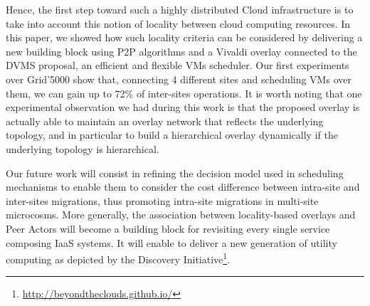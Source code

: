 Hence, the first step toward such a highly distributed Cloud infrastructure is to take
into account this notion of locality between cloud computing resources. In this paper, we
showed how such locality criteria can be considered by delivering a new building block using
P2P algorithms and a Vivaldi overlay connected to the DVMS proposal, an efficient and
flexible VMs scheduler. Our first experiments over Grid'5000 show that, connecting 4
different sites and scheduling VMs over them, we can gain up to 72\% of inter-sites
operations. It is worth noting that one experimental observation we had during this work
is that the proposed overlay is actually able to maintain an overlay network that
reflects the underlying topology, and in particular to build a hierarchical overlay
dynamically if the underlying topology is hierarchical.

Our future work will consist in refining the decision model used in scheduling mechanisms
to enable them to consider the cost difference between intra-site and inter-sites
migrations, thus promoting intra-site migrations in multi-site microcosms. More generally,
the association between locality-based overlays and Peer Actors will become a building block
for revisiting every single service composing IaaS systems. It will enable to deliver a
new generation of utility computing as depicted by the Discovery
Initiative\footnote{\url{http://beyondtheclouds.github.io/}}.
